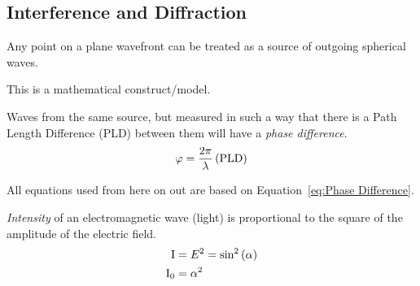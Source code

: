 	\subsection{Interference and Diffraction} \label{subsec:Interference and Diffraction}
		\begin{definition} \label{def:Huygen's Principle}
			Any point on a plane wavefront can be treated as a source of outgoing spherical waves.
			\begin{note}
				This is a mathematical construct/model.
			\end{note}
		\end{definition}
		\begin{definition} \label{def:Phase Difference}
			Waves from the same source, but measured in such a way that there is a Path Length Difference (PLD) between them will have a \emph{phase difference}.
			\begin{equation} \label{eq:Phase Difference}
				\varphi = \frac{2 \pi}{\lambda} \left( \operatorname{\text{PLD}} \right)
			\end{equation}
		\end{definition}
	All  equations used from here on out are based on Equation~\eqref{eq:Phase Difference}.
		\begin{definition}[Intensity] \label{def:Intensity}
			\emph{Intensity} of an electromagnetic wave (light) is proportional to the square of the amplitude of the electric field.
			\begin{equation} \label{eq:Intensity}
				\begin{aligned}
					\operatorname{I} &= E^{2} = \sin^{2} \left( \alpha \right) \\
					\operatorname{I}_{0} &= \alpha^{2} \\
				\end{aligned}
			\end{equation}
		\end{definition}
		
